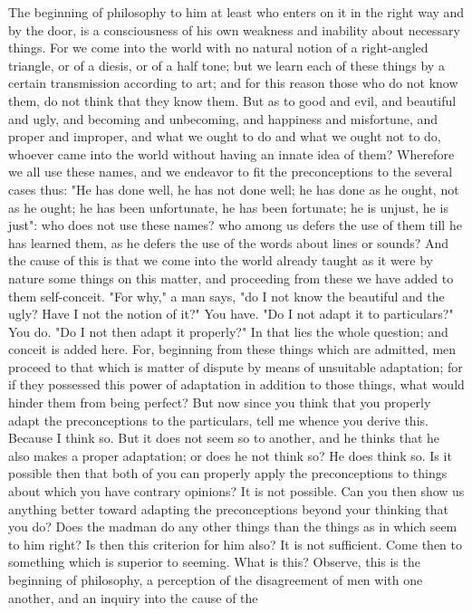\documentclass[a4paper]{article}
\begin{document}
    The beginning of philosophy to him at least who enters on it in the right
way and by the door, is a consciousness of his own weakness and inability about
necessary things. For we come into the world with no natural notion of a
right-angled triangle, or of a diesis, or of a half tone; but we learn each of
these things by a certain transmission according to art; and for this reason
those who do not know them, do not think that they know them. But as to good
and evil, and beautiful and ugly, and becoming and unbecoming, and happiness
and misfortune, and proper and improper, and what we ought to do and what we
ought not to do, whoever came into the world without having an innate idea of
them? Wherefore we all use these names, and we endeavor to fit the
preconceptions to the several cases thus: "He has done well, he has not done
well; he has done as he ought, not as he ought; he has been unfortunate, he has
been fortunate; he is unjust, he is just": who does not use these names? who
among us defers the use of them till he has learned them, as he defers the use
of the words about lines or sounds? And the cause of this is that we come into
the world already taught as it were by nature some things on this matter, and
proceeding from these we have added to them self-conceit. "For why," a man
says, "do I not know the beautiful and the ugly? Have I not the notion of it?"
You have. "Do I not adapt it to particulars?" You do. "Do I not then adapt it
properly?" In that lies the whole question; and conceit is added here. For,
beginning from these things which are admitted, men proceed to that which is
matter of dispute by means of unsuitable adaptation; for if they possessed this
power of adaptation in addition to those things, what would hinder them from
being perfect? But now since you think that you properly adapt the
preconceptions to the particulars, tell me whence you derive this. Because I
think so. But it does not seem so to another, and he thinks that he also makes
a proper adaptation; or does he not think so? He does think so. Is it possible
then that both of you can properly apply the preconceptions to things about
which you have contrary opinions? It is not possible. Can you then show us
anything better toward adapting the preconceptions beyond your thinking that
you do? Does the madman do any other things than the things as in which seem to
him right? Is then this criterion for him also? It is not sufficient. Come then
to something which is superior to seeming. What is this?
    Observe, this is the beginning of philosophy, a perception of the
disagreement of men with one another, and an inquiry into the cause of the
\end{document}
